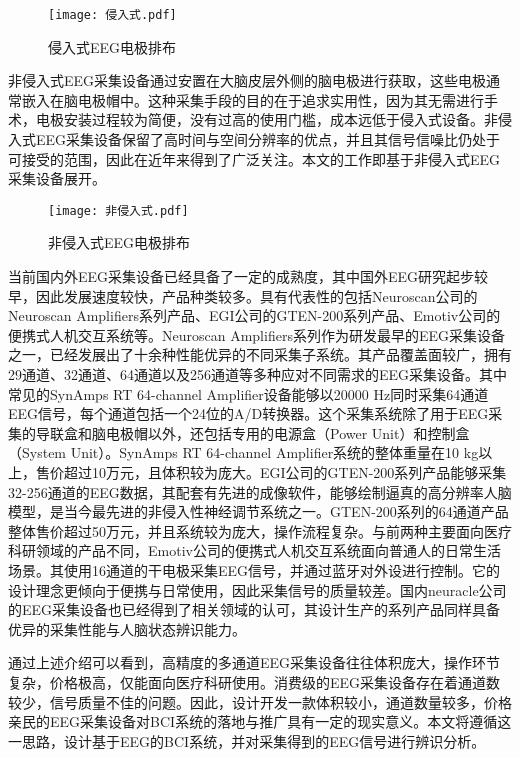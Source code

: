 \begin{figure}[h]
	\centering
	\texttt{[image: 侵入式.pdf]}
	\caption{侵入式EEG电极排布\cite{1-54}}
	\label{fig1-7}
\end{figure}


非侵入式EEG采集设备通过安置在大脑皮层外侧的脑电极进行获取，这些电极通常嵌入在脑电极帽中。这种采集手段的目的在于追求实用性，因为其无需进行手术，电极安装过程较为简便，没有过高的使用门槛，成本远低于侵入式设备。非侵入式EEG采集设备保留了高时间与空间分辨率的优点，并且其信号信噪比仍处于可接受的范围，因此在近年来得到了广泛关注\cite{1-55}。本文的工作即基于非侵入式EEG采集设备展开。

\begin{figure}[h]
	\centering
	\texttt{[image: 非侵入式.pdf]}
	\caption{非侵入式EEG电极排布}
	\label{fig:graph3}
\end{figure}

当前国内外EEG采集设备已经具备了一定的成熟度，其中国外EEG研究起步较早，因此发展速度较快，产品种类较多。具有代表性的包括Neuroscan公司的Neuroscan Amplifiers系列产品、EGI公司的GTEN-200系列产品、Emotiv公司的便携式人机交互系统等。Neuroscan Amplifiers系列作为研发最早的EEG采集设备之一，已经发展出了十余种性能优异的不同采集子系统。其产品覆盖面较广，拥有29通道、32通道、64通道以及256通道等多种应对不同需求的EEG采集设备。其中常见的SynAmps RT 64-channel Amplifier设备能够以20000 Hz同时采集64通道EEG信号，每个通道包括一个24位的A/D转换器。这个采集系统除了用于EEG采集的导联盒和脑电极帽以外，还包括专用的电源盒（Power Unit）和控制盒（System Unit）。SynAmps RT 64-channel Amplifier系统的整体重量在10 kg以上，售价超过10万元，且体积较为庞大。EGI公司的GTEN-200系列产品能够采集32-256通道的EEG数据，其配套有先进的成像软件，能够绘制逼真的高分辨率人脑模型，是当今最先进的非侵入性神经调节系统之一。GTEN-200系列的64通道产品整体售价超过50万元，并且系统较为庞大，操作流程复杂。与前两种主要面向医疗科研领域的产品不同，Emotiv公司的便携式人机交互系统面向普通人的日常生活场景。其使用16通道的干电极采集EEG信号，并通过蓝牙对外设进行控制。它的设计理念更倾向于便携与日常使用，因此采集信号的质量较差。国内neuracle公司的EEG采集设备也已经得到了相关领域的认可，其设计生产的系列产品同样具备优异的采集性能与人脑状态辨识能力。

通过上述介绍可以看到，高精度的多通道EEG采集设备往往体积庞大，操作环节复杂，价格极高，仅能面向医疗科研使用。消费级的EEG采集设备存在着通道数较少，信号质量不佳的问题。因此，设计开发一款体积较小，通道数量较多，价格亲民的EEG采集设备对BCI系统的落地与推广具有一定的现实意义。本文将遵循这一思路，设计基于EEG的BCI系统，并对采集得到的EEG信号进行辨识分析。

